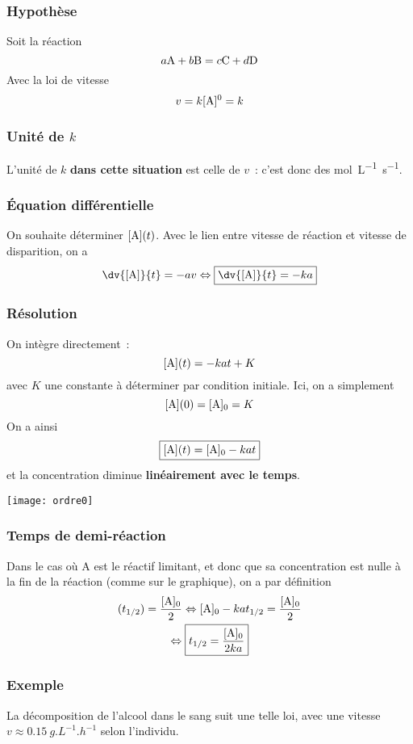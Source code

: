 \documentclass[../main/main.tex]{subfiles}
\begin{document}
\subsubsection{Hypothèse}
Soit la réaction
\[a{\rm A} + b{\rm B}
        =
  c{\rm C} +d{\rm D}
\]
Avec la loi de vitesse
\[v = k [{\rm A}]^0 = k\]

\subsubsection{Unité de $k$}

L'unité de $k$ \textbf{dans cette situation} est celle de $v$~: c'est donc des
\si{mol.L^{-1}.s^{-1}}.

\subsubsection{Équation différentielle}
On souhaite déterminer $[{\rm A}](t)$. Avec le lien entre vitesse de réaction et
vitesse de disparition, on a
\[ \dv{[{\rm A}]}{t} = -av \Leftrightarrow \boxed{\dv{[{\rm A}]}{t} = -ka}\]

\subsubsection{Résolution}
On intègre directement~:
\[[{\rm A}](t) = -kat + K\]
avec $K$ une constante à déterminer par condition initiale. Ici, on a simplement
\[[{\rm A}](0) = [{\rm A}]_0 = K\]
On a ainsi
\[\boxed{[{\rm A}](t) = [{\rm A}]_0 - kat}\]
et la concentration diminue \textbf{linéairement avec le temps}.

\begin{center}
    \texttt{[image: ordre0]}
\end{center}

\subsubsection{Temps de demi-réaction}
Dans le cas où A est le réactif limitant, et donc que sa concentration est nulle
à la fin de la réaction (comme sur le graphique), on a par définition
\begin{gather*}
    [{\rm A}](t_{1/2}) = \frac{[{\rm A}]_0}{2}
    \Leftrightarrow
    [{\rm A}]_0 - kat_{1/2} = \frac{[{\rm A}]_0}{2}\\
    \Leftrightarrow
    \boxed{t_{1/2} = \frac{[{\rm A}]_0}{2ka}}
\end{gather*}

\subsubsection{Exemple}
La décomposition de l'alcool dans le sang suit une telle loi, avec une vitesse
$v \approx \SI{0.15}{g.L^{-1}.h^{-1}}$ selon l'individu.
\end{document}
